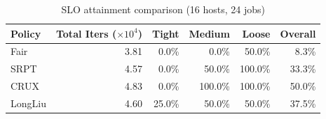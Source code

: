 \begin{table}[t]
\centering
\caption{SLO attainment comparison (16 hosts, 24 jobs)}
\label{tab:slo_16host}
\begin{tabular}{l|r|r|r|r|r}
\hline
Policy & Total Iters ($\times 10^4$) & Tight & Medium & Loose & Overall \\
\hline
Fair & 3.81 & 0.0\% & 0.0\% & 50.0\% & 8.3\% \\
SRPT & 4.57 & 0.0\% & 50.0\% & 100.0\% & 33.3\% \\
CRUX & 4.83 & 0.0\% & 100.0\% & 100.0\% & 50.0\% \\
LongLiu & 4.60 & 25.0\% & 50.0\% & 50.0\% & 37.5\% \\
\hline
\end{tabular}
\end{table}
